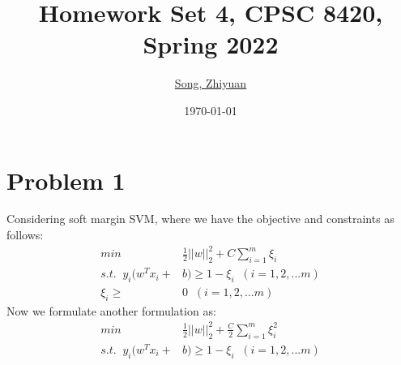 \documentclass[11pt]{article}
\title{{\bf Homework Set 4, CPSC 8420, Spring 2022}} %
\author{\Large\underline{Song, Zhiyuan}}
\date{\today}
\begin{document}
	\maketitle
	
	\section*{Problem 1}
	Considering soft margin SVM, where we have the objective and constraints as follows:
	\begin{equation}\label{eq:1}
		\begin{aligned}
			min\;\; &\frac{1}{2}||w||_2^2 +C\sum\limits_{i=1}^{m}\xi_i\\s.t.  \;\; y_i(w^Tx_i + &b)  \geq 1 - \xi_i \;\;(i =1,2,...m)\\\xi_i \geq &0 \;\;(i =1,2,...m)
		\end{aligned}
	\end{equation}
	Now we formulate another formulation as:
	\begin{equation}\label{eq:2}
		\begin{aligned}
			min\;\; &\frac{1}{2}||w||_2^2 +\frac{C}{2}\sum\limits_{i=1}^{m}\xi_i^2\\s.t.  \;\; y_i(w^Tx_i + &b)  \geq 1 - \xi_i \;\;(i =1,2,...m)
		\end{aligned}
	\end{equation}
\end{document}
